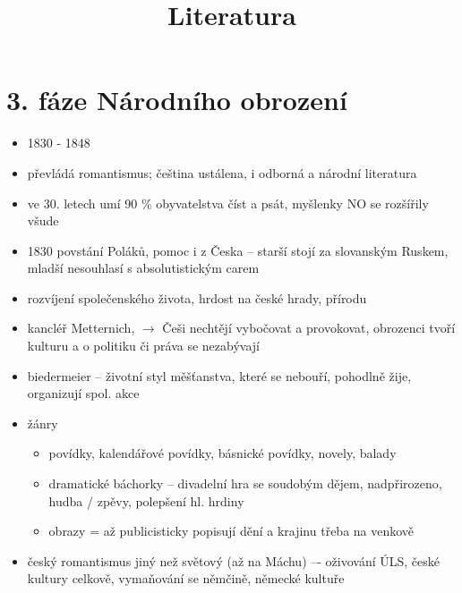 \documentclass{article}
\title{\vspace{-2cm}Literatura\vspace{-1.7cm}}
\date{}
\author{}
\begin{document}
\maketitle

\part{3. fáze Národního obrození}
\begin{itemize}
  \item 1830 - 1848
  \item převládá romantismus; čeština ustálena, i odborná a národní literatura
  \item ve 30. letech umí 90 \% obyvatelstva číst a psát, myšlenky NO se rozšířily všude
  \item 1830 povstání Poláků, pomoc i z Česka -- starší stojí za slovanským Ruskem, mladší nesouhlasí s absolutistickým carem
  \item rozvíjení společenského života, hrdost na české hrady, přírodu
  \item kancléř Metternich,  $\rightarrow$ Češi nechtějí vybočovat a provokovat, obrozenci tvoří kulturu a o politiku či práva se nezabývají
  \item biedermeier -- životní styl měšťanstva, které se nebouří, pohodlně žije, organizují spol. akce
  \item žánry
  \begin{itemize}
    \item povídky, kalendářové povídky, básnické povídky, novely, balady
    \item dramatické báchorky -- divadelní hra se soudobým dějem, nadpřirozeno, hudba / zpěvy, polepšení hl. hrdiny
    \item obrazy = až publicisticky popisují dění a krajinu třeba na venkově
  \end{itemize}
  \item český romantismus jiný než světový (až na Máchu) –- oživování ÚLS, české kultury celkově, vymaňování se němčině, německé kultuře
\end{itemize}
\end{document}
